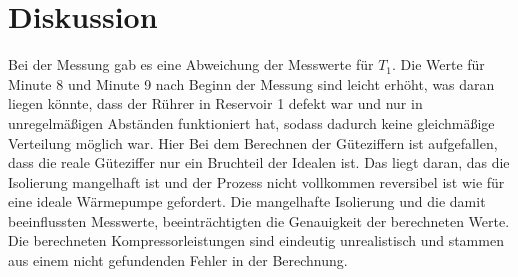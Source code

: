 \section{Diskussion}
\label{sec:Diskussion}
Bei der Messung gab es eine Abweichung der Messwerte für $T_1$. Die Werte für
Minute 8 und Minute 9 nach Beginn der Messung sind leicht erhöht, was daran
liegen könnte, dass der Rührer in Reservoir 1 defekt war und nur in unregelmäßigen
Abständen funktioniert hat, sodass dadurch keine gleichmäßige Verteilung möglich war. Hier
Bei dem Berechnen der Güteziffern ist aufgefallen, dass die reale Güteziffer nur
ein Bruchteil der Idealen ist. Das liegt daran, das die Isolierung mangelhaft ist
und der Prozess nicht vollkommen reversibel ist wie für eine ideale Wärmepumpe
gefordert. Die mangelhafte Isolierung und die damit beeinflussten Messwerte,
beeinträchtigten die Genauigkeit der berechneten Werte. Die berechneten
Kompressorleistungen sind eindeutig unrealistisch und stammen aus einem nicht
gefundenden Fehler in der Berechnung.

